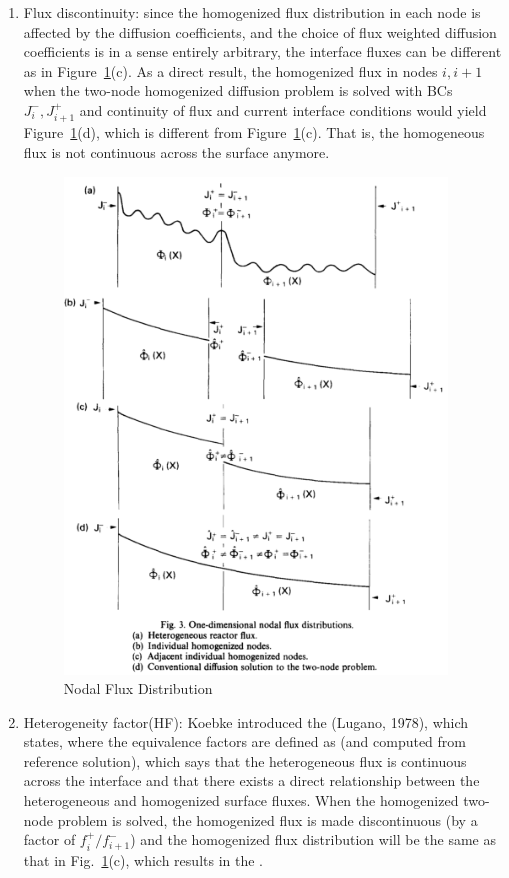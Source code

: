 \documentclass{school-22.211-notes}
\begin{document}
\begin{enumerate}
\item Flux discontinuity: since the homogenized flux distribution in each node is affected by the diffusion coefficients, and the choice of flux weighted diffusion coefficients is in a sense entirely arbitrary, the interface fluxes can be different as in Figure~\ref{1Dnodal-flux}(c). As a direct result, the homogenized flux in nodes $i, i+1$ when the two-node homogenized diffusion problem is solved with BCs $J_i^-, J_{i+1}^+$ and continuity of flux and current interface conditions would yield Figure~\ref{1Dnodal-flux}(d), which is different from Figure~\ref{1Dnodal-flux}(c). That is, the homogeneous flux is not continuous across the surface anymore. 
\begin{figure}[ht]
  \centering
  \includegraphics[width=4in]{images/methd/1Dnodal-flux.png}
  \caption{Nodal Flux Distribution} \label{1Dnodal-flux}
\end{figure}

\item Heterogeneity factor(HF): Koebke introduced the (Lugano, 1978), which states,
where the equivalence factors are defined as (and computed from reference solution), 
which says that the heterogeneous flux is continuous across the interface and that there exists a direct relationship between the heterogeneous and homogenized surface fluxes. When the homogenized two-node problem is solved, the homogenized flux is made discontinuous (by a factor of $f_i^+/f_{i+1}^-$) and the homogenized flux distribution will be the same as that in Fig.~\ref{1Dnodal-flux}(c), which results in the . 


\end{enumerate}
\end{document}
